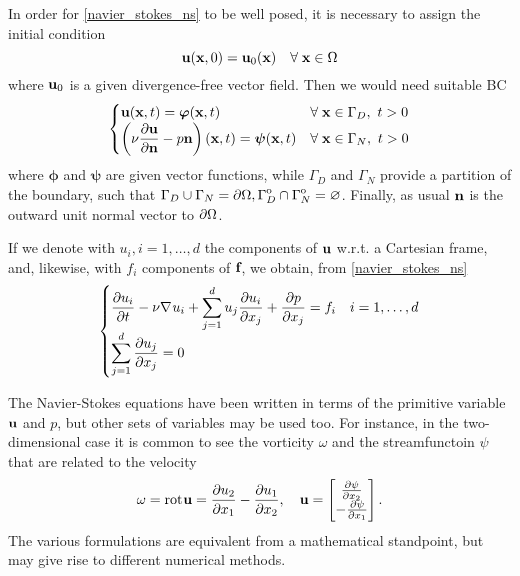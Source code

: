 In order for \eqref{navier_stokes_ns} to be well posed, it is necessary to assign the initial condition 
\begin{equation}
    \textbf{u}(\textbf{x}, 0) = \textbf{u}_0(\textbf{x}) \quad \forall \; \textbf{x} \in \Omega
    \label{initial_condition_ns}
\end{equation}
where \(\textbf{u}_0\) is a given divergence-free vector field. Then we would need suitable BC
\begin{equation}
    \begin{cases}
        \uvec(\xvec, t) = \bm{\phi}(\xvec, t) & \forall \; \xvec \in \Gamma_D, \ t > 0 \\
        \displaystyle \left( \nu \partialderivative{\uvec}{\vect{n}} - p\normal  \right)\left( \xvec, t \right) = \bm{\psi}(\xvec, t) & \forall \; \xvec \in \Gamma_N, \ t > 0 
    \end{cases}
    \label{boundaries_ns}
\end{equation}
where \(\bm{\phi}\) and \(\bm{\psi}\) are given vector functions, while \(\Gamma_D\) and \(\Gamma_N\) provide a partition of the boundary, such that \(\Gamma_D \cup \Gamma_N = {\partial\Omega}, {\kern0pt\Gamma}^{\mathrm{o}}_D \cap {\kern0pt\Gamma}^{\mathrm{o}}_N =\varnothing\).
Finally, as usual \(\textbf{n}\) is the outward unit normal vector to \({\partial\Omega}\).

If we denote with \(u_i, i = 1,\ldots, d\) the components of \(\textbf{u}\) w.r.t. a Cartesian frame, and, likewise, with \(f_i\) components of \(\textbf{f}\), we obtain, from \eqref{navier_stokes_ns}
\[
    \begin{cases}
        \displaystyle \partialderivative{u_i}{t} - \nu \grad u_i + \sum_{j=1}^{d} u_j\partialderivative{u_i}{x_j} + \partialderivative{p}{x_j} = f_i & i = 1,\ldots, d \\
        \displaystyle \sum_{j=1}^{d} \partialderivative{u_j}{x_j} = 0
    \end{cases}
\]
\begin{remark}
    The Navier-Stokes equations have been written in terms of the primitive variable \(\textbf{u}\) and \(p\), but other sets of variables may be used too. For instance, in the two-dimensional case it is common to see the vorticity \(\omega\) and the streamfunctoin \(\psi\) that are related to the velocity
    \begin{equation*}
        \omega =\rot\uvec = \partialderivative{u_2}{x_1} - \partialderivative{u_1}{x_2}, \quad \uvec = \left[ \begin{matrix*}
            \partialderivative{\psi}{x_2} \\
            -\partialderivative{\psi}{x_1}
        \end{matrix*} \right].
    \end{equation*}
    The various formulations are equivalent from a mathematical standpoint, but may give rise to different numerical methods.
\end{remark}
